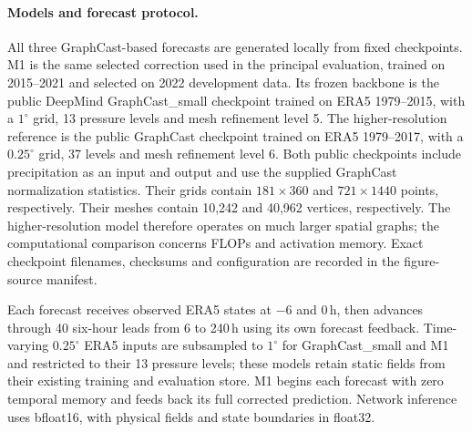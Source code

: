     \caption{Forecast RMSE relative to the matched ECMWF ensemble mean (ENS) on a common $1.5^\circ$ grid. From left to right: 700\,hPa specific humidity (Q700), $2$\,m temperature (T2m), and 850\,hPa zonal wind (U850). Blue shows the selected GraphCast--Mamba model M1 ($1^\circ$), dashed gray its public GraphCast\_small backbone ($1^\circ$), and green the public GraphCast checkpoint ($0.25^\circ$). From 122 candidate 00\,UTC initializations every third day in 2023, each diagnostic and lead uses the identical ENS-available dates for all four forecasts (92--105 starts per point in these panels). Squared errors are pooled before taking square roots. The horizontal line marks ENS at $100\%$; lower values indicate lower RMSE. Appendix~\ref{app:common_grid} specifies the protocol.}

\paragraph{Models and forecast protocol.}
All three GraphCast-based forecasts are generated locally from fixed checkpoints. M1 is the same selected correction used in the principal evaluation, trained on 2015--2021 and selected on 2022 development data. Its frozen backbone is the public DeepMind GraphCast\_small checkpoint trained on ERA5 1979--2015, with a $1^\circ$ grid, 13 pressure levels and mesh refinement level 5. The higher-resolution reference is the public GraphCast checkpoint trained on ERA5 1979--2017, with a $0.25^\circ$ grid, 37 levels and mesh refinement level 6. Both public checkpoints include precipitation as an input and output and use the supplied GraphCast normalization statistics. Their grids contain $181\times360$ and $721\times1440$ points, respectively. Their meshes contain 10,242 and 40,962 vertices, respectively. The higher-resolution model therefore operates on much larger spatial graphs; the computational comparison concerns FLOPs and activation memory. Exact checkpoint filenames, checksums and configuration are recorded in the figure-source manifest.

Each forecast receives observed ERA5 states at $-6$ and $0$\,h, then advances through 40 six-hour leads from 6 to 240\,h using its own forecast feedback. Time-varying $0.25^\circ$ ERA5 inputs are subsampled to $1^\circ$ for GraphCast\_small and M1 and restricted to their 13 pressure levels; these models retain static fields from their existing training and evaluation store. M1 begins each forecast with zero temporal memory and feeds back its full corrected prediction. Network inference uses bfloat16, with physical fields and state boundaries in float32.

